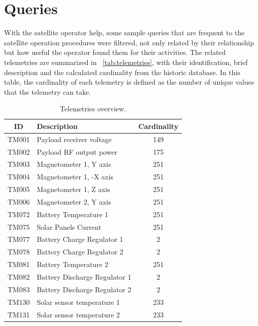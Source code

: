 \section{Queries}\label{ch:querypart:queries}

With the satellite operator help, some sample queries that are frequent to the satellite operation procedures were filtered, not only related by their relationship but how useful the operator found them for their activities.
The related telemetries are summarized in ~\autoref{tab:telemetries}, with their identification, brief description and the calculated cardinality from the historic database.
In this table, the cardinality of each telemetry is defined as the number of unique values that the telemetry can take.

\begin{table}[H]
  \begin{center}
    \caption{Telemetries overview.}\label{tab:telemetries}
    \begin{tabular}{|c|p{6cm}|c|}
      \hline
      \textbf{ID} & \textbf{Description} & \textbf{Cardinality} \\
      \hline
      TM001 & Payload receiver voltage & 149 \\
      \hline
      TM002 & Payload RF output power & 175 \\
      \hline
      TM003 & Magnetometer 1, Y axis & 251 \\
      \hline
      TM004 & Magnetometer 1, -X axis & 251 \\
      \hline
      TM005 & Magnetometer 1, Z axis & 251 \\
      \hline
      TM006 & Magnetometer 2, Y axis & 251 \\
      \hline
      TM072 & Battery Temperature 1 & 251 \\
      \hline
      TM075 & Solar Panels Current & 251 \\
      \hline
      TM077 & Battery Charge Regulator 1 & 2 \\
      \hline
      TM078 & Battery Charge Regulator 2 & 2 \\
      \hline
      TM081 & Battery Temperature 2 & 251 \\
      \hline
      TM082 & Battery Discharge Regulator 1 & 2 \\
      \hline
      TM083 & Battery Discharge Regulator 2  & 2 \\
      \hline
      TM130 & Solar sensor temperature 1 & 233 \\
      \hline
      TM131 & Solar sensor temperature 2 & 233 \\
      \hline
    \end{tabular}
  \end{center}
\end{table}


